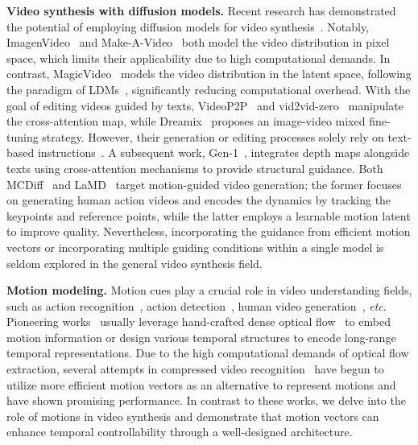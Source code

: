 \textbf{Video synthesis with diffusion models.}
Recent research has demonstrated the potential of employing diffusion models for video synthesis~\cite{ho2022video_diffusion_models,yang2022DPM_video,harvey2022flexible_diffusion_video,luo2023videofusion,khachatryan2023text2video-zero,blattmann2023align_latents}.
Notably, ImagenVideo~\cite{ho2022imagenvideo} and Make-A-Video~\cite{singer2022make-a-video} both model the video distribution in pixel space, which limits their applicability due to high computational demands.
In contrast, MagicVideo~\cite{zhou2022magicvideo} models the video distribution in the latent space, following the paradigm of LDMs~\cite{rombach2022LDM}, significantly reducing computational overhead.
With the goal of editing videos guided by texts, VideoP2P~\cite{liu2023video-P2P} and vid2vid-zero~\cite{wang2023vid2vid-zero} manipulate the cross-attention map, while Dreamix~\cite{molad2023dreamix} proposes an image-video mixed fine-tuning strategy.
However, their generation or editing processes solely rely on text-based instructions~\cite{radford2021CLIP,raffel2020T5}.
A subsequent work, Gen-1~\cite{esser2023gen-1}, integrates depth maps alongside texts using cross-attention mechanisms to provide structural guidance.
Both MCDiff~\cite{chen2023MCDiff} and LaMD~\cite{hu2023LaMD} target motion-guided video generation; the former focuses on generating human action videos and encodes the dynamics by tracking the keypoints and reference points, while the latter employs a learnable motion latent to improve quality.
Nevertheless, incorporating the guidance from efficient motion vectors or incorporating multiple guiding conditions within a single model is seldom explored in the general video synthesis field. 

\textbf{Motion modeling.}
Motion cues play a crucial role in video understanding fields, such as action recognition~\cite{wang2016temporal,varol2017long,qiu2017learning,carreira2017quo,wang2021tdn,arnab2021vivit,bertasius2021space}, action detection~\cite{zhao2017temporal,weinzaepfel2015learning,cheng2022tallformer,zeng2019graph}, human video generation~\cite{ohnishi2018hierarchical,wang2020g3an,ni2023conditional}, \emph{etc}.
Pioneering works~\cite{wang2016temporal,qiu2017learning,arnab2021vivit,wang2020g3an,ni2023conditional,carreira2017quo} usually leverage hand-crafted dense optical flow~\cite{zach2007duality} to embed motion information or design various temporal structures to encode long-range temporal representations.
Due to the high computational demands of optical flow extraction, several attempts in compressed video recognition~\cite{zhang2016real,wu2018compressed,shou2019dmc,chen2022mm} have begun to utilize more efficient motion vectors as an alternative to represent motions and have shown promising performance.
In contrast to these works, we delve into the role of motions in video synthesis and demonstrate that motion vectors can enhance temporal controllability through a well-designed architecture.

